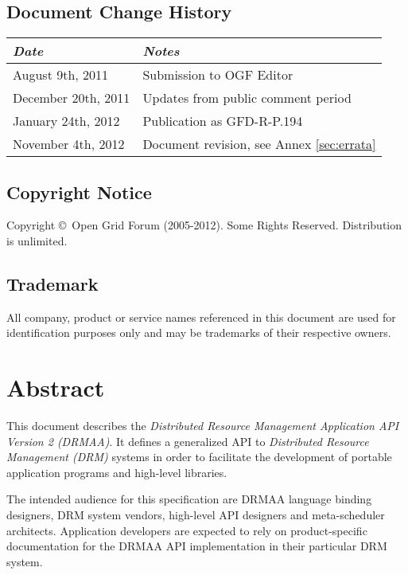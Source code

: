 \documentclass{article}
\newcommand{\copyrightyears}{2005-2012}
\begin{document}
\subsection*{Document Change History}
\begin{table}[ht]
\centering
\begin{tabularx}{\textwidth}{XX}
\toprule
\emph{Date} & \emph{Notes} \\
\midrule
August    9th, 2011 & Submission to OGF Editor \\
December 20th, 2011 & Updates from public comment period \\
January  24th, 2012 & Publication as GFD-R-P.194 \\
November  4th, 2012 & Document revision, see Annex \ref{sec:errata} \\
\bottomrule
\end{tabularx}
\end{table}

\subsection*{Copyright Notice}

Copyright \copyright \ Open Grid Forum (\copyrightyears).  Some Rights Reserved.  
Distribution is unlimited.

\subsection*{Trademark}

All company, product or service names referenced in this document are used for identification purposes only and may be trademarks of their respective owners. 

\section*{Abstract}

This document describes the \emph{Distributed Resource Management Application API Version 2 (DRMAA)}. It defines a generalized API to \emph{Distributed Resource Management (DRM)} systems in order to facilitate the development of portable application programs and high-level libraries. 

The intended audience for this specification are DRMAA language binding designers, DRM system vendors, high-level API designers and meta-scheduler architects. Application developers are expected to rely on product-specific documentation for the DRMAA API implementation in their particular DRM system.
\end{document}
